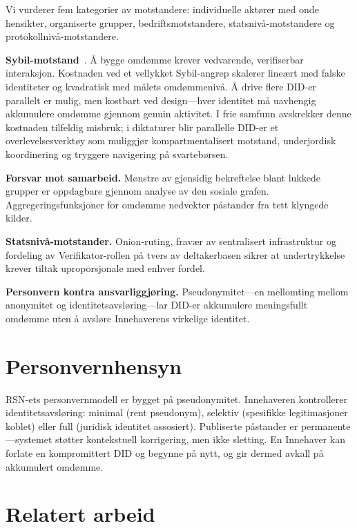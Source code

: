 \documentclass[11pt,a4paper,twocolumn]{article}
\begin{document}
Vi vurderer fem kategorier av motstandere: individuelle aktører med onde hensikter, organiserte grupper, bedriftsmotstandere, statsnivå-motstandere og protokollnivå-motstandere.

\textbf{Sybil-motstand}~\cite{douceur2002}. Å bygge omdømme krever vedvarende, verifiserbar interaksjon. Kostnaden ved et vellykket Sybil-angrep skalerer lineært med falske identiteter og kvadratisk med målets omdømmenivå. Å drive flere DID-er parallelt er mulig, men kostbart ved design---hver identitet må uavhengig akkumulere omdømme gjennom genuin aktivitet. I frie samfunn avskrekker denne kostnaden tilfeldig misbruk; i diktaturer blir parallelle DID-er et overlevelsesverktøy som muliggjør kompartmentalisert motstand, underjordisk koordinering og tryggere navigering på svartebørsen.

\textbf{Forsvar mot samarbeid.} Mønstre av gjensidig bekreftelse blant lukkede grupper er oppdagbare gjennom analyse av den sosiale grafen. Aggregeringsfunksjoner for omdømme nedvekter påstander fra tett klyngede kilder.

\textbf{Statsnivå-motstander.} Onion-ruting, fravær av sentralisert infrastruktur og fordeling av Verifikator-rollen på tvers av deltakerbasen sikrer at undertrykkelse krever tiltak uproporsjonale med enhver fordel.

\textbf{Personvern kontra ansvarliggjøring.} Pseudonymitet---en mellomting mellom anonymitet og identitetsavsløring---lar DID-er akkumulere meningsfullt omdømme uten å avsløre Innehaverens virkelige identitet.

\section{Personvernhensyn}

RSN-ets personvernmodell er bygget på pseudonymitet. Innehaveren kontrollerer identitetsavsløring: minimal (rent pseudonym), selektiv (spesifikke legitimasjoner koblet) eller full (juridisk identitet assosiert). Publiserte påstander er permanente---systemet støtter kontekstuell korrigering, men ikke sletting. En Innehaver kan forlate en kompromittert DID og begynne på nytt, og gir dermed avkall på akkumulert omdømme.

\section{Relatert arbeid}
\end{document}
